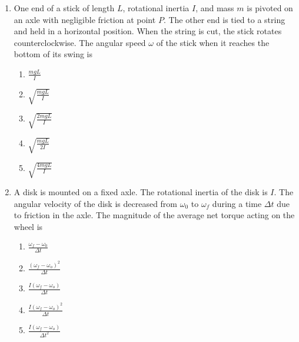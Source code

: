 \documentclass{../../../oss-classkick}
\begin{document}
\begin{multicols}{2}
\begin{enumerate}[leftmargin=18pt]
  \item One end of a stick of length $L$, rotational inertia $I$, and mass $m$
    is pivoted on an axle with negligible friction at point $P$. The other end
    is tied to a string and held in a horizontal position. When the string is
    cut, the stick rotates counterclockwise. The angular speed $\omega$ of the
    stick when it reaches the bottom of its swing is
    \begin{enumerate}[nosep,leftmargin=18pt,label=(\Alph*)]
    \item$\displaystyle\frac{mgL}{I}$
    \item$\displaystyle\sqrt{\frac{mgL}{I}}$
    \item$\displaystyle\sqrt{\frac{2mgL}{I}}$
    \item$\displaystyle\sqrt{\frac{mgL}{2I}}$
    \item$\displaystyle\sqrt{\frac{4mgL}{I}}$
    \end{enumerate}
    
  \item A disk is mounted on a fixed axle. The rotational inertia of the disk is
    $I$. The angular velocity of the disk is decreased from $\omega_0$ to
    $\omega_f$ during a time $\Delta t$ due to friction in the axle. The
    magnitude of the average net torque acting on the wheel is
    \begin{enumerate}[noitemsep,topsep=0pt,leftmargin=18pt,label=(\Alph*)]
    \item $\displaystyle\frac{\omega_f-\omega_0}{\Delta t}$
    \item $\displaystyle\frac{(\omega_f-\omega_o)^2}{\Delta t}$
    \item $\displaystyle\frac{I(\omega_f-\omega_o)}{\Delta t}$
    \item $\displaystyle\frac{I(\omega_f-\omega_o)^2}{\Delta t}$
    \item $\displaystyle\frac{I(\omega_f-\omega_o)}{\Delta t^2}$
    \end{enumerate}
    \columnbreak
    

\end{enumerate}
\end{multicols}
\end{document}
